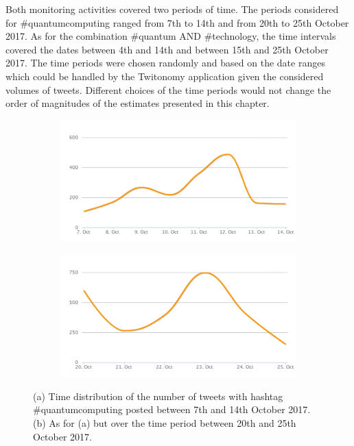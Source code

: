 Both monitoring activities covered two periods of time. The periods considered for \#quantumcomputing ranged from 7th to 14th and from 20th to 25th October 2017. As for the combination \#quantum AND \#technology, the  time intervals covered the dates between 4th and 14th and between 15th and 25th October 2017. The time periods were chosen randomly and based on the date ranges which could be handled by the Twitonomy application given the considered volumes of tweets. Different choices of the time periods would not change the order of magnitudes of the estimates presented in this chapter.  

\begin{figure}
 \centering
 \begin{subfigure}[t]{0.9\textwidth}
   \includegraphics[width=1\linewidth]{Images/FirstSearch_QuantumComputing.png}
   \caption{} 
 \end{subfigure}

 \begin{subfigure}[t]{0.9\textwidth}
   \includegraphics[width=1\linewidth]{Images/SecondSearch_QuantumComputing.png}
   \caption{}
 \end{subfigure}
 \caption{(a) Time distribution of the number of tweets with hashtag \#quantumcomputing posted between 7th and 14th October 2017. (b) As for (a) but over the time period between 20th and 25th October 2017.} 
 \label{First-SecondSearch_QuantumComputing}
\end{figure}

